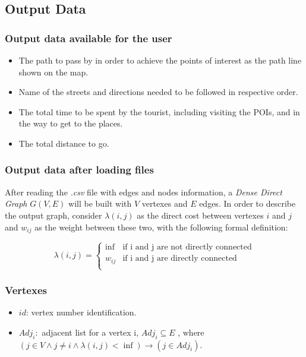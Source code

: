 \documentclass{article}
\begin{document}
\subsection*{Output Data}
    \subsubsection*{Output data available for the user}
    \begin{itemize}
        \item The path to pass by in order to achieve the points of interest as the path line shown on the map.
        \item Name of the streets and directions needed to be followed in respective order.
        \item The total time to be spent by the tourist, including visiting the POIs, and in the way to get to the places.
        \item The total distance to go.
    \end{itemize}

    \subsubsection*{Output data after loading files}
    After reading the \textit{.csv} file with edges and nodes information, a \textit{Dense Direct Graph} $G(V,E)$ will be built with $V$ vertexes and $E$ edges. In order to describe the output graph, consider $\lambda(i,j)$ as the direct cost between vertexes $i$ and $j$ and $w_{ij}$ as the weight between these two, with the following formal definition:

    \begin{equation}
      \lambda(i,j) =
        \begin{cases}
          \inf & \text{if i and j are not directly connected}\\
          w_{ij} & \text{if i and j are directly connected}\\
        \end{cases}
    \end{equation}

    \subsubsection*{Vertexes}
    \begin{itemize}
        \item $id$: vertex number identification.
        \item $Adj_i: $ adjacent list for a vertex i, $Adj_i \subseteq E$  , where $(j \in V \wedge j \neq i \wedge \lambda(i,j) < \inf) \rightarrow (j \in Adj_{i})$.
    \end{itemize}
\end{document}
